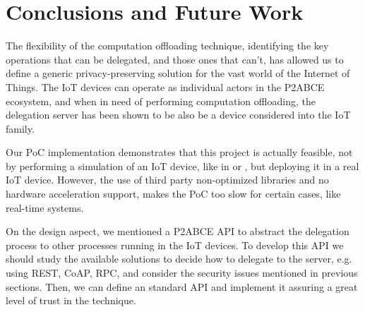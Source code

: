 \section{Conclusions and Future Work}\label{ch:conclusions}




The flexibility of the computation offloading technique, identifying the key operations that can be delegated, and those ones that can't, has allowed us to define a generic privacy-preserving solution for the vast world of the Internet of Things. The IoT devices can operate as individual actors in the P2ABCE ecosystem, and when in need of performing computation offloading, the delegation server has been shown to be also be a device considered into the IoT family.



Our PoC implementation demonstrates that this project is actually feasible, not by performing a simulation of an IoT device, like in \cite{vanet} or \cite{alcaide2013anonymous}, but deploying it in a real IoT device. However, the use of third party non-optimized libraries and no hardware acceleration support, makes the PoC too slow for certain cases, like real-time systems.


On the design aspect, we mentioned a P2ABCE API to abstract the delegation process to other processes running in the IoT devices. To develop this API we should study the available solutions to decide how to delegate to the server, e.g. using REST, CoAP, RPC, and consider the security issues mentioned in previous sections. Then, we can define an standard API and implement it assuring a great level of trust in the technique.



